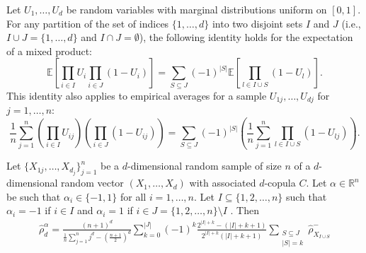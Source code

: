 \documentclass[10pt,a4paper]{amsart}
\begin{document}
\begin{lemma}\label{lem:aux}
\label{lem:generalized_product_decomposition}
Let $U_1, \ldots, U_d$ be random variables with marginal distributions uniform on $[0,1]$. For any partition of the set of indices $\{1, \ldots, d\}$ into two disjoint sets $I$ and $J$ (i.e., $I \cup J = \{1, \ldots, d\}$ and $I \cap J = \emptyset$), the following identity holds for the expectation of a mixed product:
$$ \mathbb{E}\left[ \prod_{i \in I} U_i \prod_{i \in J} (1-U_i) \right] = \sum_{S \subseteq J} (-1)^{|S|} \mathbb{E}\left[ \prod_{l \in I \cup S} (1 - U_l) \right]. $$
This identity also applies to empirical averages for a sample $U_{1j}, \ldots, U_{dj}$ for $j=1, \ldots, n$:
$$ \frac{1}{n}\sum_{j=1}^n \left(\prod_{i \in I} U_{ij}\right) \left(\prod_{i \in J} (1-U_{ij})\right) = \sum_{S \subseteq J} (-1)^{|S|} \left( \frac{1}{n} \sum_{j=1}^n \prod_{l \in I \cup S} (1 - U_{lj}) \right). $$
\end{lemma}

\begin{theorem}{\label{th:est}}
    Let $\{X_{1j},\ldots,X_{d_j}\}_{j=1}^n$ be a $d$-dimensional random sample of size $n$ of a $d$-dimensional random vector $(X_1,\ldots,X_d)$ with associated $d$-copula $C$. Let $\alpha\in\mathbb{R}^n$ be such that $\alpha_i\in\{-1,1\}$ for all $i=1,\ldots,n$. Let $I\subseteq\{1,2,\ldots,n\}$ such that $\alpha_i=-1$ if $i\in I$ and $\alpha_i=1$ if $i\in J=\{1,2,\ldots,n\}\setminus I$%
    . Then
\begin{align}\label{eq:estimator}
\widehat{\rho}_d^{\alpha} = \frac{(n+1)^d}{\frac{1}{n}\sum_{j=1}^nj^d-\left(\frac{n+1}{2}\right)^d} \sum_{k=0}^{|J|} (-1)^k \frac{2^{|I|+k}-(|I|+k+1)}{2^{|I|+k}(|I|+k+1)} \sum_{\substack{S \subseteq J \\ |S|=k}} \widehat{\rho}_{X_{I\cup S}}^-
\end{align}
\end{theorem}
\end{document}
